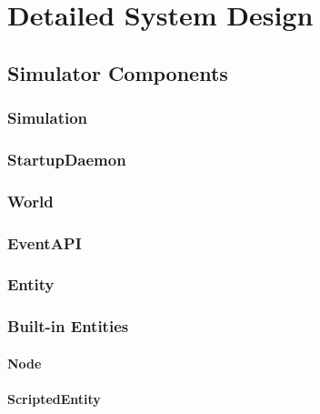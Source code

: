 \documentclass[titlepage]{article}
\begin{document}
\section{Detailed System Design}

\subsection{Simulator Components}
\subsubsection{Simulation}
\subsubsection{StartupDaemon}
\subsubsection{World}
\subsubsection{EventAPI}

\subsubsection{Entity}
\subsubsection{Built-in Entities}
\paragraph{Node}
\paragraph{ScriptedEntity}
\end{document}
